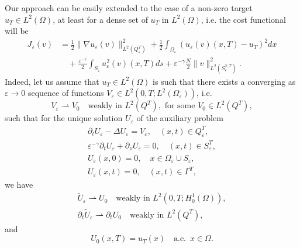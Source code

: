 \documentclass[reqno]{amsart}
\begin{document}
\begin{remark}
\label{Rem target nonzero} \rm
Our approach can be easily extended to the case of
a non-zero target $u_{T}\in L^2(\Omega )$, at least for a dense set of $%
u_{T}$ in $L^2(\Omega )$, i.e. the cost functional will be%
\begin{equation}
\begin{aligned}
J_{\varepsilon }(v) 
&= \frac{1}{2}\| \nabla {u_{\varepsilon }(v)}\|
_{L^2(Q_{\varepsilon }^{T})}^2+\frac{1}{2}\int _{\Omega
_{\varepsilon }}\left( u_{\varepsilon }(v)(x,T)-u_{T}\right) ^2dx
\\
&\quad +\frac{{\varepsilon }^{-\gamma }}{2}\int _{S_{\varepsilon
}}u_{\varepsilon }^2(v)(x,T){ds}+\varepsilon ^{-\gamma }\frac{N}{2}\| {v%
}\| _{L^2(S_{\varepsilon }^{2,T})}^2.
\end{aligned}  \label{nonzero cost}
\end{equation}
Indeed, let us assume that $u_{T}\in L^2(\Omega )$ is such that there
exists a converging as $\varepsilon \to0$ sequence of functions $%
V_{\varepsilon }\in L^2(0,T;L^2(\Omega _{\varepsilon }))$, i.e.
\begin{equation}
V_{\varepsilon }\rightharpoonup V_0\quad \text{weakly in }L^2(Q^{T}),
\text{ for some }V_0\in L^2(Q^{T}),  \label{hypo Weak  conver Ve}
\end{equation}
such that for the unique solution $U_{\varepsilon }$ of the auxiliary
problem
\begin{equation}
\begin{gathered}
\partial _{t}U_{\varepsilon }-\Delta U_{\varepsilon }=V_{\varepsilon }, \quad
(x,t)\in Q_{\varepsilon }^{T}, \\
\varepsilon ^{-\gamma }\partial _{t}U_{\varepsilon }+\partial _{\nu
}U_{\varepsilon }=0, \quad (x,t)\in S_{\varepsilon }^{T}, \\
U_{\varepsilon }(x,0)=0, \quad x\in \Omega _{\varepsilon }\cup S_{\varepsilon
}, \\
U_{\varepsilon }(x,t)=0, \quad (x,t)\in \Gamma ^{T},%
\end{gathered}
\end{equation}
we have
\begin{gather*}
\widetilde{U}_{\varepsilon }\rightharpoonup U_0\quad \text{weakly in }
L^2(0,T;H_0^{1}(\Omega )), \\
\partial _{t}\widetilde{U}_{\varepsilon }\rightharpoonup \partial _{t}U_0
\quad \text{weakly in }L^2(Q^{T}),
\end{gather*}
and
\[
U_0(x,T)=u_{T}(x)\quad \text{a.e. }\, x\in \Omega .
\]
\end{remark}
\end{document}
